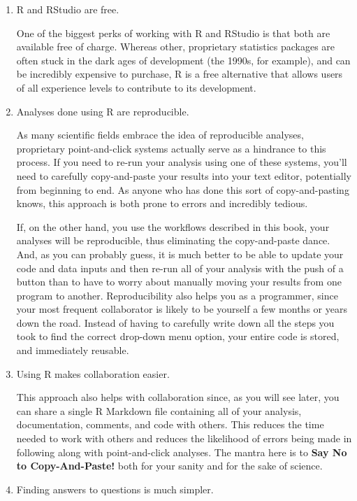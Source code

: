 \documentclass[]{tufte-book}
\begin{document}
\begin{enumerate}
\def\labelenumi{\arabic{enumi}.}
\item
  R and RStudio are free.

  One of the biggest perks of working with R and RStudio is that both are available free of charge. Whereas other, proprietary statistics packages are often stuck in the dark ages of development (the 1990s, for example), and can be incredibly expensive to purchase, R is a free alternative that allows users of all experience levels to contribute to its development.
\item
  Analyses done using R are reproducible.

  As many scientific fields embrace the idea of reproducible analyses, proprietary point-and-click systems actually serve as a hindrance to this process. If you need to re-run your analysis using one of these systems, you'll need to carefully copy-and-paste your results into your text editor, potentially from beginning to end. As anyone who has done this sort of copy-and-pasting knows, this approach is both prone to errors and incredibly tedious.

  If, on the other hand, you use the workflows described in this book, your analyses will be reproducible, thus eliminating the copy-and-paste dance. And, as you can probably guess, it is much better to be able to update your code and data inputs and then re-run all of your analysis with the push of a button than to have to worry about manually moving your results from one program to another. Reproducibility also helps you as a programmer, since your most frequent collaborator is likely to be yourself a few months or years down the road. Instead of having to carefully write down all the steps you took to find the correct drop-down menu option, your entire code is stored, and immediately reusable.
\item
  Using R makes collaboration easier.

  This approach also helps with collaboration since, as you will see later, you can share a single R Markdown file containing all of your analysis, documentation, comments, and code with others. This reduces the time needed to work with others and reduces the likelihood of errors being made in following along with point-and-click analyses. The mantra here is to \textbf{Say No to Copy-And-Paste!} both for your sanity and for the sake of science.
\item
  Finding answers to questions is much simpler.


\end{enumerate}
\end{document}
